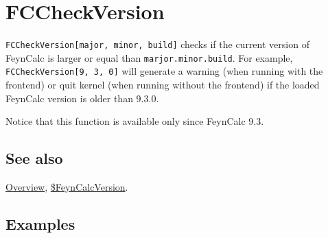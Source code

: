 \documentclass[../FeynCalcManual.tex]{subfiles}
\begin{document}
\hypertarget{fccheckversion}{%
\section{FCCheckVersion}\label{fccheckversion}}

\texttt{FCCheckVersion[\allowbreak{}major,\ \allowbreak{}minor,\ \allowbreak{}build]}
checks if the current version of FeynCalc is larger or equal than
\texttt{marjor.minor.build}. For example,
\texttt{FCCheckVersion[\allowbreak{}9,\ \allowbreak{}3,\ \allowbreak{}0]}
will generate a warning (when running with the frontend) or quit kernel
(when running without the frontend) if the loaded FeynCalc version is
older than 9.3.0.

Notice that this function is available only since FeynCalc 9.3.

\subsection{See also}

\hyperlink{toc}{Overview},
\hyperlink{feyncalcversion}{\$FeynCalcVersion}.

\subsection{Examples}

\begin{Shaded}
\begin{Highlighting}[]
\OperatorTok{[}\OperatorTok{,} \OperatorTok{,} \OperatorTok{]}
\end{Highlighting}
\end{Shaded}

\begin{Shaded}
\begin{Highlighting}[]
\end{Highlighting}
\end{Shaded}
\end{document}
